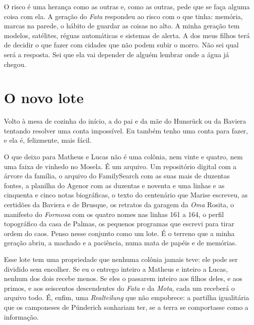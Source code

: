\documentclass[
  brazilian,
  11pt,
  openany]{book}
\begin{document}
O risco é uma herança como as outras e, como as outras, pede que se faça
alguma coisa com ela. A geração do \emph{Fata} respondeu ao risco com o
que tinha: memória, marcas na parede, o hábito de guardar as coisas no
alto. A minha geração tem modelos, satélites, réguas automáticas e
sistemas de alerta. A dos meus filhos terá de decidir o que fazer com
cidades que não podem subir o morro. Não sei qual será a resposta. Sei
que ela vai depender de alguém lembrar onde a água já chegou.

\section{O novo lote}\label{o-novo-lote}

Volto à mesa de cozinha do início, a do pai e da mãe do Hunsrück ou da
Baviera tentando resolver uma conta impossível. Eu também tenho uma
conta para fazer, e ela é, felizmente, mais fácil.

O que deixo para Matheus e Lucas não é uma colônia, nem vinte e quatro,
nem uma faixa de vinhedo no Mosela. É um arquivo. Um repositório digital
com a árvore da família, o arquivo do FamilySearch com as suas mais de
duzentas fontes, a planilha do Agenor com as duzentas e noventa e uma
linhas e as cinquenta e cinco notas biográficas, o texto do centenário
que Marise escreveu, as certidões da Baviera e de Brusque, os retratos
da garagem da \emph{Oma} Rosita, o manifesto do \emph{Formosa} com os
quatro nomes nas linhas 161 a 164, o perfil topográfico da casa de
Palmas, os pequenos programas que escrevi para tirar ordem do caos.
Penso nesse conjunto como um lote. É o terreno que a minha geração
abriu, a machado e a paciência, numa mata de papéis e de memórias.

Esse lote tem uma propriedade que nenhuma colônia jamais teve: ele pode
ser dividido sem encolher. Se eu o entrego inteiro a Matheus e inteiro a
Lucas, nenhum dos dois recebe menos. Se eles o passarem inteiro aos
filhos deles, e aos primos, e aos seiscentos descendentes do \emph{Fata}
e da \emph{Mota}, cada um receberá o arquivo todo. É, enfim, uma
\emph{Realteilung} que não empobrece: a partilha igualitária que os
camponeses de Pünderich sonhariam ter, se a terra se comportasse como a
informação.
\end{document}
